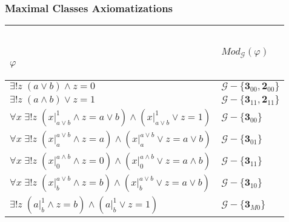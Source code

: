 \documentclass[12pt,handout]{beamer}
\begin{document}
\begin{frame}
 \frametitle{Maximal Classes Axiomatizations}

\begin{tabular}{ | l | l | }

\hline                       \

$\varphi$ & $Mod_{\mathcal{G}}(\varphi)$ \\

\hline

$\exists ! z \; (a \vee b) \wedge z = 0$     	& \pause  $\mathcal{G} - \{\mathbf3_{00} , \mathbf2_{00}\}$ %
\\

\pause

$\exists ! z \; (a \wedge b) \vee z = 1$     	& \pause $\mathcal{G} - \{\mathbf3_{11} , \mathbf2_{11}\}$ %
\\

\pause

$\forall x \; \exists ! z \; ( x|_{a \vee b}^1 \wedge z = a \vee b ) 

\wedge  (x|_{a \vee b}^1 \vee z = 1) $ & \pause $\mathcal{G} - \{\mathbf3_{00}\}$ %
\\

\pause

$\forall x \; \exists ! z \; (x|_{a}^{a \vee b} \wedge z = a)

\wedge (x|_{a}^{a \vee b} \vee z = a \vee b)$ 
& \pause $\mathcal{G} - \{\mathbf3_{01}\}$ %
\\

\pause

$\forall x \; \exists ! z \; ( x|_0^{a \wedge b} \wedge z = 0) 

\wedge  (x|_0^{a \wedge b} \vee z = a \wedge b)$ & \pause $\mathcal{G} - \{\mathbf3_{11}\}$ %
 \\

\pause

$ \forall x \; \exists ! z \; (x|_{b}^{a \vee b} \wedge z = b)

\wedge (x|_{b}^{a \vee b} \vee z = a \vee b)$ & \pause $\mathcal{G} - \{\mathbf3_{10}\}$ %
 \\

\pause

$\exists ! z \; ( a|_b^1 \wedge z = b ) 

\wedge  (a|_b^1 \vee z = 1)$ & \pause $\mathcal{G} - \{\mathbf3_{M0}\}$ %
\\


\end{tabular}
\end{frame}
\end{document}
